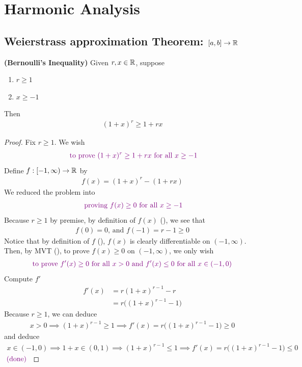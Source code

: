 \documentclass{report}
\begin{document}
\chapter{Harmonic Analysis}
\section{Weierstrass approximation Theorem: $[a,b]\rightarrow \mathbb{R}$}
\begin{theorem}
\label{Bernoulli's Inequality}
\textbf{(Bernoulli's Inequality)} Given $r,x \in\mathbb{R}$, suppose 
\begin{enumerate}[label=(\alph*)]
  \item $r\geq 1$ 
  \item $x\geq -1$
\end{enumerate}
Then
\begin{align*}
  (1+x)^r\geq 1+rx
\end{align*}
\end{theorem}
\begin{proof}
Fix $r\geq 1$. We wish 
\begin{align*}
\textcolor{violet}{\text{ to prove }(1+x)^r\geq 1+rx\text{ for all  }x \geq -1}
\end{align*}
Define $f:[-1,\infty)\rightarrow \mathbb{R}$ by 
 \begin{align}
\label{Bere1}
f(x)=(1+x)^r-(1+rx)
\end{align}
We reduced the problem into  
\begin{align*}
\textcolor{violet}{\text{ proving }f(x)\geq 0\text{ for all } x\geq -1}
\end{align*}
Because $r\geq 1$ by premise, by definition of $f(x)$  (), we see that 
\begin{align*}
f(0)=0\text{, and }f(-1)=r-1\geq 0
\end{align*}
Notice that by definition of $f$  (),  $f(x)$ is clearly differentiable on $(-1,\infty)$.\\

Then, by MVT (), to prove $f(x)\geq 0$ on $(-1,\infty)$, we only wish 
\begin{align*}
\textcolor{violet}{\text{ to prove }f'(x)\geq 0\text{ for all }x> 0\text{ and }f'(x)\leq 0\text{ for all $x \in (-1,0)$ }}
\end{align*}
Compute $f'$
 \begin{align*}
f'(x)&=r(1+x)^{r-1}-r\\
&=r\Big((1+x)^{r-1}-1 \Big)
\end{align*}
Because $r\geq 1$, we can deduce 
\begin{align*}
x>0 \implies (1+x)^{r-1}\geq 1 \implies f'(x)=r\Big((1+x)^{r-1}-1 \Big)\geq 0
\end{align*}
and deduce 
\begin{align*}
x \in (-1,0) \implies 1+x \in (0,1) \implies (1+x)^{r-1}\leq 1 \implies f'(x)=r\Big((1+x)^{r-1}-1 \Big)\leq  0
\end{align*}
$\textcolor{violet}{\text{ (done) }}$
\end{proof}
\end{document}
